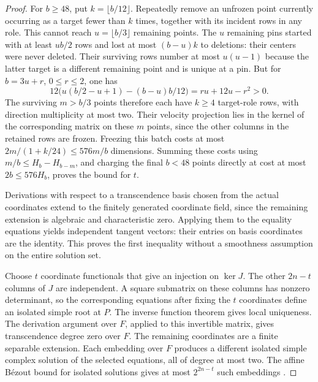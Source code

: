 \begin{proof}
For \(b\ge48\), put \(k=\lfloor b/12\rfloor\). Repeatedly remove an unfrozen
point currently occurring as a target fewer than \(k\) times, together with
its incident rows in any role. This cannot reach \(u=\lfloor b/3\rfloor\)
remaining points. The \(u\) remaining pins started with at least \(ub/2\)
rows and lost at most \((b-u)k\) to deletions: their centers were never
deleted. Their surviving rows number at most \(u(u-1)\) because the latter
target is a different remaining point and is unique at a pin. But for
\(b=3u+r\), \(0\le r\le2\), one has
\[
 12\bigl(u(b/2-u+1)-(b-u)b/12\bigr)=ru+12u-r^2>0.
\]
The surviving \(m>b/3\) points therefore each have \(k\ge4\) target-role
rows, with direction multiplicity at most two. Their velocity projection
lies in the kernel of the corresponding matrix on these \(m\) points,
since the other columns in the retained rows are frozen. Freezing this
batch costs at most \(2m/(1+k/24)\le576m/b\) dimensions. Summing these costs
using \(m/b\le H_b-H_{b-m}\), and charging the final \(b<48\) points directly
at cost at most \(2b\le576H_b\), proves the bound for \(t\).

Derivations with respect to a transcendence basis chosen from the actual
coordinates extend to the finitely generated coordinate field, since the
remaining extension is algebraic and characteristic zero. Applying them to
the equality equations yields independent tangent vectors: their entries
on basis coordinates are the identity. This proves the first inequality
without a smoothness assumption on the entire solution set.

Choose \(t\) coordinate functionals that give an injection on \(\ker J\).
The other \(2n-t\) columns of \(J\) are independent. A square submatrix on
these columns has nonzero determinant, so the corresponding equations after
fixing the \(t\) coordinates define an isolated simple root at \(P\).
The inverse function theorem gives local uniqueness. The derivation argument
over \(F\), applied to this invertible matrix, gives transcendence degree
zero over \(F\). The remaining coordinates are a finite separable extension.
Each embedding over \(F\) produces a different isolated simple complex
solution of the selected equations, all of degree at most two. The affine
B\'ezout bound for isolated solutions gives at most \(2^{2n-t}\) such
embeddings \cite{heintz}.
\end{proof}
